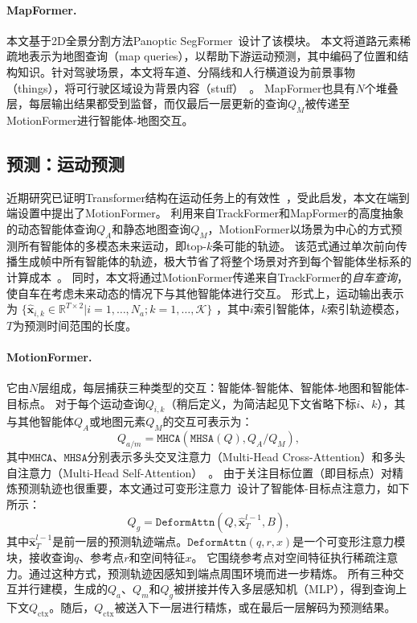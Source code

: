 \documentclass[10pt,twocolumn,letterpaper]{article}
\begin{document}
\paragraph{MapFormer.} 本文基于2D全景分割方法Panoptic SegFormer~\cite{li2022panopticseg}设计了该模块。
%
本文将道路元素稀疏地表示为地图查询（map queries），以帮助下游运动预测，其中编码了位置和结构知识。针对驾驶场景，本文将车道、分隔线和人行横道设为前景事物（things），将可行驶区域设为背景内容（stuff）~\cite{kirillov2019panoptic}。
%
MapFormer也具有$N$个堆叠层，每层输出结果都受到监督，而仅最后一层更新的查询$Q_M$被传递至MotionFormer进行智能体-地图交互。


\subsection{预测：运动预测}
\label{sec:motion-method}
\vspace{-4pt}
近期研究已证明Transformer结构在运动任务上的有效性~\cite{liu2021multimodal, yuan2021agentformer, jia2021allocentric, jia2022hdgt, nayakanti2022wayformer, shi2022motiontransformer, ngiam2021scenetransformer}，受此启发，本文在端到端设置中提出了MotionFormer。
%
利用来自TrackFormer和MapFormer的高度抽象的动态智能体查询$Q_A$和静态地图查询$Q_M$，MotionFormer以场景为中心的方式预测所有智能体的多模态未来运动，即top-$k$条可能的轨迹。
%
该范式通过单次前向传播生成帧中所有智能体的轨迹，极大节省了将整个场景对齐到每个智能体坐标系的计算成本~\cite{kim2022stopnet}。
%
同时，本文将通过MotionFormer传递来自TrackFormer的\textit{自车查询}，使自车在考虑未来动态的情况下与其他智能体进行交互。
%
形式上，运动输出表示为
$\!\{\hat{\mathbf{x}}_{i,k}\!\in\!\mathbb{R}^{T\!\times\!2} | i\!=1,\dots,N_a; k\!=\!1,\dots,\mathcal{K}\}$
，其中$i$索引智能体，$k$索引轨迹模态，$T$为预测时间范围的长度。

\paragraph{MotionFormer.} 它由$N$层组成，每层捕获三种类型的交互：智能体-智能体、智能体-地图和智能体-目标点。
%
对于每个运动查询$Q_{i,k}$（稍后定义，为简洁起见下文省略下标$i$、$k$），其与其他智能体$Q_{A}$或地图元素$Q_{M}$的交互可表示为：
%
\begin{equation}
\label{eq:agent-agent}
    Q_{a/m} = \texttt{MHCA}(\texttt{MHSA}(Q), Q_A/Q_M),
\end{equation}
%
其中$\texttt{MHCA}$、$\texttt{MHSA}$分别表示多头交叉注意力（Multi-Head Cross-Attention）和多头自注意力（Multi-Head Self-Attention）~\cite{vaswani2017transformer}。
%
由于关注目标位置（即目标点）对精炼预测轨迹也很重要，本文通过可变形注意力~\cite{zhu2020deformabledetr}设计了智能体-目标点注意力，如下所示：
\begin{equation}
\label{eq:agent-bev}
    Q_{g} = \texttt{DeformAttn}(Q, \hat{\mathbf{x}}_{T}^{l-1}, B),
\end{equation}
其中$\hat{\mathbf{x}}_T^{l-1}$是前一层的预测轨迹端点。$\texttt{DeformAttn}(q,\!r,\!x)$是一个可变形注意力模块，接收查询$q$、参考点$r$和空间特征$x$。
%
它围绕参考点对空间特征执行稀疏注意力。通过这种方式，预测轨迹因感知到端点周围环境而进一步精炼。
%
所有三种交互并行建模，生成的$Q_a$、$Q_m$和$Q_g$被拼接并传入多层感知机（MLP），得到查询上下文$Q_{\text{ctx}}$。随后，$Q_{\text{ctx}}$被送入下一层进行精炼，或在最后一层解码为预测结果。
%
\end{document}
